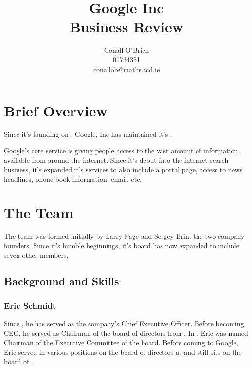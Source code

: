 \documentclass[a4paper,12pt]{article}
\begin{document}
\title{Google Inc \\ Business Review}

\author{Conall O'Brien \\ 01734351 \\ conallob@maths.tcd.ie}

\maketitle

\newpage

\doublespacing

\section{Brief Overview}

Since it's founding on \cite[September 7, 1998]{timeline}, Google, Inc
has maintained it's \cite[mission is to organize the world's information
and make it universally accessible and useful]{overview}.


Google's core service is giving people access to the vast amount of
information available from around the internet. Since it's debut into
the internet search business, it's expanded it's services to also
include a portal page, access to news headlines, phone book information,
email, etc.

\section{The Team}

The team was formed initially by Larry Page and Sergey Brin, the two
company founders. Since it's humble beginnings, it's board has now
expanded to include seven other members.

\subsection{Background and Skills}

\subsubsection{Eric Schmidt} 

Since \cite[July 2001]{board}, he has served as the company's Chief Executive 
Officer. Before becoming CEO, he served as Chairman of the board of 
directors from \cite[March 2001 to April 2004]{board}. In 
\cite[April 2004]{board}, 
Eric was named Chairman of the Executive Committee of the board. 
Before coming to Google, Eric served in various positions on the board
of directors at \cite[Novell and sun Microsystems]{board} and still sits
on the board of \cite[Siebel System]{board}. \cite[Eric has a Bachelor of Science degree
in electrical engineering from Princeton University, and a Masters
degree and Ph.D. in computer science from the University of California
at Berkeley.]{board}
\end{document}
